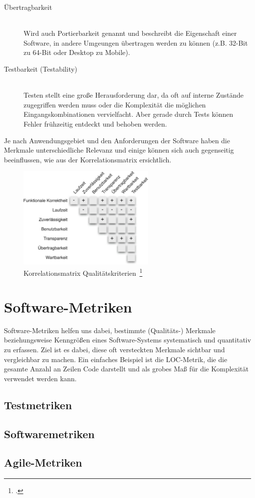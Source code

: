 \begin{description}
\begin{description}
    \item[Übertragbarkeit] \hfill \\ Wird auch Portierbarkeit genannt und beschreibt die Eigenschaft einer Software, in andere Umgeungen übertragen werden zu können (z.B. 32-Bit zu 64-Bit oder Desktop zu Mobile).
    \item[Testbarkeit (Testability)] \hfill \\ Testen stellt eine große Herausforderung dar, da oft auf interne Zustände zugegriffen werden muss oder die Komplexität die möglichen Eingangskombinationen vervielfacht. Aber gerade durch Tests können Fehler frühzeitig entdeckt und behoben werden.
  \end{description}
\end{description}

Je nach Anwendungsgebiet und den Anforderungen der Software haben die Merkmale unterschiedliche Relevanz und einige können sich auch gegenseitig beeinflussen, wie aus der Korrelationsmatrix ersichtlich.

\begin{savenotes}
  \begin{figure}[H] 
    \centering
       \includegraphics[width=0.6\textwidth]{img/korrelationsmatrix-kriterien.png}
    \caption[Korrelationsmatrix Qualitätskriterien]{Korrelationsmatrix Qualitätskriterien~\footcite[][S. 11, Abb. 1.3]{hoffmann_software_qualitat_2013}}\label{fig:Korrelationsmatrix Qualitätskriterien}
  \end{figure}
\end{savenotes}


\section{Software-Metriken}

Software-Metriken helfen uns dabei, bestimmte (Qualitäts-) Merkmale beziehungsweise Kenngrößen eines Software-Systems systematisch und quantitativ zu erfassen.
Ziel ist es dabei, diese oft versteckten Merkmale sichtbar und vergleichbar zu machen.
Ein einfaches Beispiel ist die \ac{LOC}-Metrik, die die gesamte Anzahl an Zeilen Code darstellt und als grobes Maß für die Komplexität verwendet werden kann.

\subsection{Testmetriken}

\subsection{Softwaremetriken}

\subsection{Agile-Metriken}
